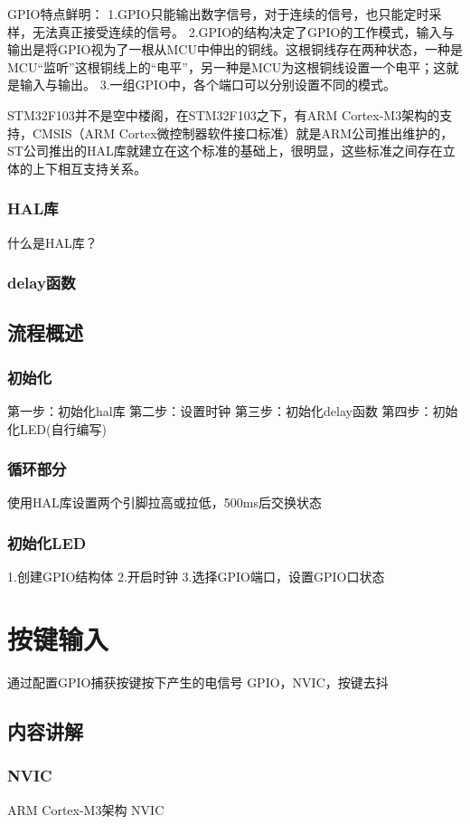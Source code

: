 \documentclass[UTF8]{ctexart}
\begin{document}
GPIO特点鲜明：
1.GPIO只能输出数字信号，对于连续的信号，也只能定时采样，无法真正接受连续的信号。
2.GPIO的结构决定了GPIO的工作模式，输入与输出是将GPIO视为了一根从MCU中伸出的铜线。这根铜线存在两种状态，一种是MCU“监听”这根铜线上的“电平”，另一种是MCU为这根铜线设置一个电平；这就是输入与输出。
3.一组GPIO中，各个端口可以分别设置不同的模式。

STM32F103并不是空中楼阁，在STM32F103之下，有ARM Cortex-M3架构的支持，CMSIS（ARM Cortex微控制器软件接口标准）就是ARM公司推出维护的，ST公司推出的HAL库就建立在这个标准的基础上，很明显，这些标准之间存在立体的上下相互支持关系。

\subsubsection{HAL库}
什么是HAL库？
\subsubsection{delay函数}
\subsection{流程概述}
\subsubsection{初始化}
第一步：初始化hal库
第二步：设置时钟
第三步：初始化delay函数
第四步：初始化LED(自行编写)
\subsubsection{循环部分}
使用HAL库设置两个引脚拉高或拉低，500ms后交换状态
\subsubsection{初始化LED}
1.创建GPIO结构体
2.开启时钟
3.选择GPIO端口，设置GPIO口状态



\section{按键输入}
通过配置GPIO捕获按键按下产生的电信号
GPIO，NVIC，按键去抖
\subsection{内容讲解}
\subsubsection{NVIC}
ARM Cortex-M3架构 NVIC
\end{document}
